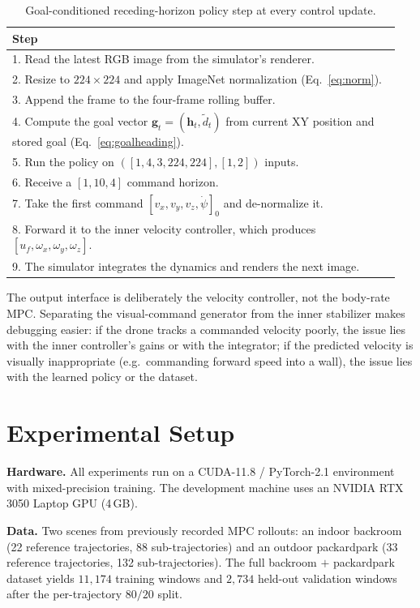 \documentclass[10pt,twocolumn,letterpaper]{article}
\begin{document}
\begin{table}[t]
\centering
\caption{Goal-conditioned receding-horizon policy step at every control update.}
\label{tab:runtime}
\small
\begin{tabular}{@{}p{0.95\linewidth}@{}}
\toprule
\textbf{Step} \\
\midrule
1. Read the latest RGB image from the simulator's renderer. \\
2. Resize to $224\times224$ and apply ImageNet normalization (Eq.~\ref{eq:norm}). \\
3. Append the frame to the four-frame rolling buffer. \\
4. Compute the goal vector $\mathbf{g}_t = (\mathbf{h}_t, \tilde{d}_t)$ from current XY position and stored goal (Eq.~\ref{eq:goalheading}). \\
5. Run the policy on $([1,4,3,224,224], [1,2])$ inputs. \\
6. Receive a $[1,10,4]$ command horizon. \\
7. Take the first command $[v_x, v_y, v_z, \dot{\psi}]_0$ and de-normalize it. \\
8. Forward it to the inner velocity controller, which produces $[u_f, \omega_x, \omega_y, \omega_z]$. \\
9. The simulator integrates the dynamics and renders the next image. \\
\bottomrule
\end{tabular}
\end{table}

The output interface is deliberately the velocity controller, not the body-rate MPC. Separating the visual-command generator from the inner stabilizer makes debugging easier: if the drone tracks a commanded velocity poorly, the issue lies with the inner controller's gains or with the integrator; if the predicted velocity is visually inappropriate (e.g.~commanding forward speed into a wall), the issue lies with the learned policy or the dataset.

\section{Experimental Setup}
\label{sec:experimental}

\textbf{Hardware.} All experiments run on a CUDA-11.8 / PyTorch-2.1 environment with mixed-precision training. The development machine uses an NVIDIA RTX 3050 Laptop GPU (4\,GB).

\textbf{Data.} Two scenes from previously recorded MPC rollouts: an indoor backroom (22 reference trajectories, 88 sub-trajectories) and an outdoor packardpark (33 reference trajectories, 132 sub-trajectories). The full backroom $+$ packardpark dataset yields $11{,}174$ training windows and $2{,}734$ held-out validation windows after the per-trajectory $80/20$ split.
\end{document}
